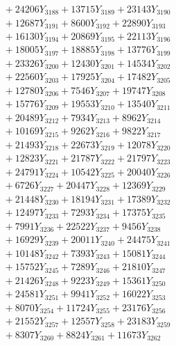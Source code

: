 \documentclass[a4paper,10pt]{article}
\begin{document}
{\begin{align}
&\;  + 24206 Y_{3188} + 13715 Y_{3189} + 23143 Y_{3190} \\[0.3ex]
&\;  + 12687 Y_{3191} + 8600 Y_{3192} + 22890 Y_{3193} \\[0.3ex]
&\;  + 16130 Y_{3194} + 20869 Y_{3195} + 22113 Y_{3196} \\[0.3ex]
&\;  + 18005 Y_{3197} + 18885 Y_{3198} + 13776 Y_{3199} \\[0.3ex]
&\;  + 23326 Y_{3200} + 12430 Y_{3201} + 14534 Y_{3202} \\[0.3ex]
&\;  + 22560 Y_{3203} + 17925 Y_{3204} + 17482 Y_{3205} \\[0.3ex]
&\;  + 12780 Y_{3206} + 7546 Y_{3207} + 19747 Y_{3208} \\[0.5ex]\allowbreak
&\;  + 15776 Y_{3209} + 19553 Y_{3210} + 13540 Y_{3211} \\[0.3ex]
&\;  + 20489 Y_{3212} + 7934 Y_{3213} + 8962 Y_{3214} \\[0.3ex]
&\;  + 10169 Y_{3215} + 9262 Y_{3216} + 9822 Y_{3217} \\[0.3ex]
&\;  + 21493 Y_{3218} + 22673 Y_{3219} + 12078 Y_{3220} \\[0.3ex]
&\;  + 12823 Y_{3221} + 21787 Y_{3222} + 21797 Y_{3223} \\[0.3ex]
&\;  + 24791 Y_{3224} + 10542 Y_{3225} + 20040 Y_{3226} \\[0.3ex]
&\;  + 6726 Y_{3227} + 20447 Y_{3228} + 12369 Y_{3229} \\[0.3ex]
&\;  + 21448 Y_{3230} + 18194 Y_{3231} + 17389 Y_{3232} \\[0.3ex]
&\;  + 12497 Y_{3233} + 7293 Y_{3234} + 17375 Y_{3235} \\[0.3ex]
&\;  + 7991 Y_{3236} + 22522 Y_{3237} + 9456 Y_{3238} \\[0.5ex]\allowbreak
&\;  + 16929 Y_{3239} + 20011 Y_{3240} + 24475 Y_{3241} \\[0.3ex]
&\;  + 10148 Y_{3242} + 7393 Y_{3243} + 15081 Y_{3244} \\[0.3ex]
&\;  + 15752 Y_{3245} + 7289 Y_{3246} + 21810 Y_{3247} \\[0.3ex]
&\;  + 21426 Y_{3248} + 9223 Y_{3249} + 15361 Y_{3250} \\[0.3ex]
&\;  + 24581 Y_{3251} + 9941 Y_{3252} + 16022 Y_{3253} \\[0.3ex]
&\;  + 8070 Y_{3254} + 11724 Y_{3255} + 23176 Y_{3256} \\[0.3ex]
&\;  + 21552 Y_{3257} + 12557 Y_{3258} + 23183 Y_{3259} \\[0.3ex]
&\;  + 8307 Y_{3260} + 8824 Y_{3261} + 11673 Y_{3262} \\[0.3ex]

\end{align}}
\end{document}
